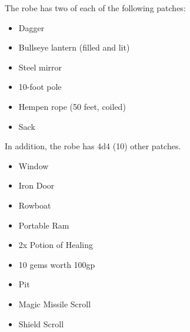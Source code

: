 \documentclass[letterpaper,openany,oneside,twocolumn]{book}
\begin{document}
The robe has two of each of the following patches:
\begin{itemize}
	\item Dagger
	\item Bullseye lantern (filled and lit)
	\item Steel mirror
	\item 10-foot pole
	\item Hempen rope (50 feet, coiled)
	\item Sack
\end{itemize}
In addition, the robe has 4d4 (10) other patches.
\begin{itemize}
	\item Window
	\item Iron Door
	\item Rowboat
	\item Portable Ram
	\item 2x Potion of Healing
	\item 10 gems worth 100gp
	\item Pit
	\item Magic Missile Scroll
	\item Shield Scroll
\end{itemize}
\end{document}
